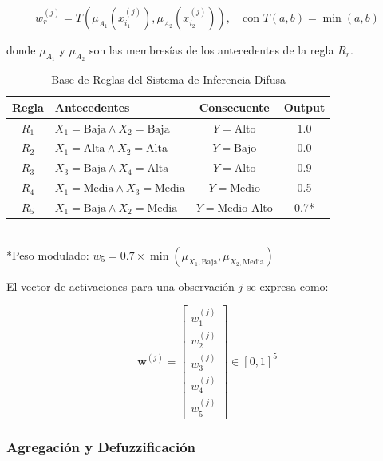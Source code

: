 \begin{equation}
w_r^{(j)} = T\left(\mu_{A_1}(x_{i_1}^{(j)}), \mu_{A_2}(x_{i_2}^{(j)})\right), \quad \text{con } T(a, b) = \min(a, b)
\label{eq:tnorm_godel}
\end{equation}

donde \(\mu_{A_1}\) y \(\mu_{A_2}\) son las membresías de los antecedentes de la regla \(R_r\).

\begin{table}[H]
\centering
\caption{Base de Reglas del Sistema de Inferencia Difusa}
\label{tab:reglas_difusas}
\small
\begin{tabular}{@{}clcc@{}}
\toprule
\textbf{Regla} & \textbf{Antecedentes} & \textbf{Consecuente} & \textbf{Output} \\
\midrule
\(R_1\) & \(X_1=\text{Baja} \land X_2=\text{Baja}\)   & \(Y=\text{Alto}\)       & 1.0 \\
\(R_2\) & \(X_1=\text{Alta} \land X_2=\text{Alta}\)   & \(Y=\text{Bajo}\)       & 0.0 \\
\(R_3\) & \(X_3=\text{Baja} \land X_4=\text{Alta}\)   & \(Y=\text{Alto}\)       & 0.9 \\
\(R_4\) & \(X_1=\text{Media} \land X_3=\text{Media}\) & \(Y=\text{Medio}\)      & 0.5 \\
\(R_5\) & \(X_1=\text{Baja} \land X_2=\text{Media}\)  & \(Y=\text{Medio-Alto}\) & 0.7* \\
\bottomrule
\end{tabular}
\\[5pt]
\footnotesize{*Peso modulado: \(w_5 = 0.7 \times \min(\mu_{X_1,\text{Baja}}, \mu_{X_2,\text{Media}})\)}
\end{table}

El vector de activaciones para una observación \(j\) se expresa como:

\begin{equation}
\mathbf{w}^{(j)} = \begin{bmatrix}
w_1^{(j)} \\
w_2^{(j)} \\
w_3^{(j)} \\
w_4^{(j)} \\
w_5^{(j)}
\end{bmatrix} \in [0,1]^5
\label{eq:vector_activaciones}
\end{equation}

\subsubsection{Agregación y Defuzzificación}
\label{subsubsec:agregacion_defuzz}

